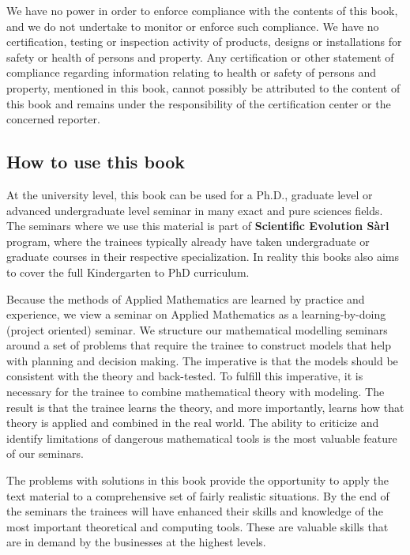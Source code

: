 	We have no power in order to enforce compliance with the contents of this book, and we do not undertake to monitor or enforce such compliance. We have no certification, testing or inspection activity of products, designs or installations for safety or health of persons and property. Any certification or other statement of compliance regarding information relating to health or safety of persons and property, mentioned in this book, cannot possibly be attributed to the content of this book and remains under the responsibility of the certification center or the concerned reporter.

	\pagebreak	
	\subsection{How to use this book}

	At the university level, this book can be used for a Ph.D., graduate level or advanced undergraduate level seminar in many exact and pure sciences fields. The seminars where we use this material is part of \textbf{Scientific Evolution Sàrl} program, where the trainees typically already have taken undergraduate or graduate courses in their respective specialization. In reality this books also aims to cover the full Kindergarten to PhD curriculum.

	Because the methods of Applied Mathematics are learned by practice and experience, we view a seminar on Applied Mathematics as a learning-by-doing (project oriented) seminar. We structure our mathematical modelling seminars around a set of problems that require the trainee to construct models that help with planning and decision making. The imperative is that the models should be consistent with the theory and back-tested. To fulfill this imperative, it is necessary for the trainee to combine mathematical theory with modeling. The result is that the trainee learns the theory, and more importantly, learns how that theory is applied and combined in the real world. The ability to criticize and identify limitations of dangerous mathematical tools is the most valuable feature of our seminars.

	The problems with solutions in this book provide the opportunity to apply the text material to a comprehensive set of fairly realistic situations. By the end of the seminars the trainees will have enhanced their skills and knowledge of the most important theoretical and computing tools. These are valuable skills that are in demand by the businesses at the highest levels.

